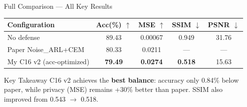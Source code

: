 \documentclass[aspectratio=169, 10pt]{beamer}
\newcommand{\good}[1]{\textcolor{goodgreen}{#1}}
\begin{document}
\begin{frame}{Full Comparison --- All Key Results}

\begin{center}
\renewcommand{\arraystretch}{1.2}
\begin{tabular}{l c c c c}
\toprule
\textbf{Configuration} & \textbf{Acc(\%)} $\uparrow$ & \textbf{MSE} $\uparrow$ & \textbf{SSIM} $\downarrow$ & \textbf{PSNR} $\downarrow$ \\
\midrule
No defense & 89.43 & 0.00067 & 0.949 & 31.76 \\
\hdashline
Paper Noise\_ARL+CEM & 80.33 & 0.0211 & --- & --- \\
\hdashline
\rowcolor{green!10}
My C16 v2 (acc-optimized) & \good{\textbf{79.49}} & \good{\textbf{0.0274}} & \good{\textbf{0.518}} & 15.63 \\
\bottomrule
\end{tabular}
\end{center}

\vspace{0.3cm}

\begin{alertblock}{Key Takeaway}
\small
C16 v2 achieves the \textbf{best balance}: accuracy only 0.84\% below paper, while privacy (MSE) remains \good{+30\%} better than paper. SSIM also improved from 0.543 $\to$ \good{0.518}.
\end{alertblock}

\end{frame}
\end{document}
